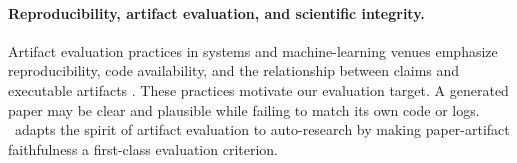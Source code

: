 \paragraph{Reproducibility, artifact evaluation, and scientific integrity.}
Artifact evaluation practices in systems and machine-learning venues emphasize reproducibility, code availability, and the relationship between claims and executable artifacts \citep{pineau2021improving,collberg2016repeatability,acm2020badging}. These practices motivate our evaluation target. A generated paper may be clear and plausible while failing to match its own code or logs. \ra\ adapts the spirit of artifact evaluation to auto-research by making paper-artifact faithfulness a first-class evaluation criterion.
